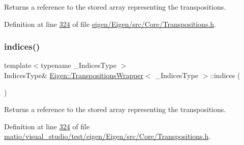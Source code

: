 \begin{DoxyReturn}{Returns}
a reference to the stored array representing the transpositions. 
\end{DoxyReturn}


Definition at line \hyperlink{eigen_2_eigen_2src_2_core_2_transpositions_8h_source_l00324}{324} of file \hyperlink{eigen_2_eigen_2src_2_core_2_transpositions_8h_source}{eigen/\+Eigen/src/\+Core/\+Transpositions.\+h}.

\mbox{\label{class_eigen_1_1_transpositions_wrapper_aab0aee4242436a7223fea797a1fa8ee9}} 
\subsubsection{\texorpdfstring{indices()}{indices()}\hspace{0.1cm}{\footnotesize\ttfamily [4/4]}}
{\footnotesize\ttfamily template$<$typename \+\_\+\+Indices\+Type $>$ \\
Indices\+Type\& \hyperlink{class_eigen_1_1_transpositions_wrapper}{Eigen\+::\+Transpositions\+Wrapper}$<$ \+\_\+\+Indices\+Type $>$\+::indices (\begin{DoxyParamCaption}{ }\end{DoxyParamCaption})\hspace{0.3cm}{\ttfamily [inline]}}

\begin{DoxyReturn}{Returns}
a reference to the stored array representing the transpositions. 
\end{DoxyReturn}


Definition at line \hyperlink{matio_2visual__studio_2test_2eigen_2_eigen_2src_2_core_2_transpositions_8h_source_l00324}{324} of file \hyperlink{matio_2visual__studio_2test_2eigen_2_eigen_2src_2_core_2_transpositions_8h_source}{matio/visual\+\_\+studio/test/eigen/\+Eigen/src/\+Core/\+Transpositions.\+h}.

\mbox{\label{class_eigen_1_1_transpositions_wrapper_ac4e1956279759cbda2c9f2784197cfe9}} 
